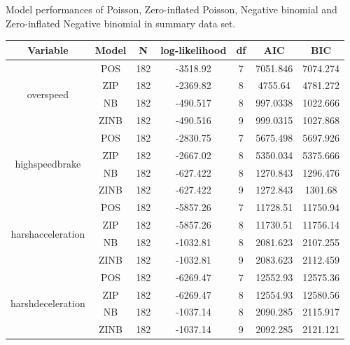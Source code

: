 \documentclass[entropy,article,submit,moreauthors,LaTeX and dvi2pdf]{Definitions/mdpi}
\begin{document}
\begin{specialtable}[htbp]
\widetable
\caption{Model performances of Poisson, Zero-inflated Poisson, Negative binomial and Zero-inflated Negative binomial in summary data set.}
\label{comparison}
\begin{tabular}{ccccccc}
\toprule
Variable                           & Model & N   & log-likelihood & df & AIC      & BIC      \\
\midrule
\multirow{4}{*}{overspeed}         & POS   & 182 & -3518.92&   7    & 7051.846 & 7074.274 \\
                                   & ZIP   & 182 & -2369.82&   8    & 4755.64  & 4781.272 \\
                                   & NB    & 182 & -490.517&    8   & 997.0338 & 1022.666 \\
                                   & ZINB  & 182 & -490.516&   9    & 999.0315 & 1027.868 \\

\multirow{4}{*}{highspeedbrake}    & POS   & 182 & -2830.75&7       & 5675.498 & 5697.926 \\
                                   & ZIP   & 182 & -2667.02&8       & 5350.034 & 5375.666 \\
                                   & NB    & 182 & -627.422&8       & 1270.843 & 1296.476 \\
                                   & ZINB  & 182 & -627.422&9       & 1272.843 & 1301.68  \\

\multirow{4}{*}{harshacceleration} & POS   & 182 & -5857.26&7       & 11728.51 & 11750.94 \\
                                   & ZIP   & 182 & -5857.26&8       & 11730.51 & 11756.14 \\
                                   & NB    & 182 & -1032.81&8       & 2081.623 & 2107.255 \\
                                   & ZINB  & 182 & -1032.81&9       & 2083.623 & 2112.459 \\

\multirow{4}{*}{harshdeceleration} & POS   & 182 & -6269.47&7       & 12552.93 & 12575.36 \\
                                   & ZIP   & 182 & -6269.47&8       & 12554.93 & 12580.56 \\
                                   & NB    & 182 & -1037.14&8       & 2090.285 & 2115.917 \\
                                   & ZINB  & 182 & -1037.14&9       & 2092.285 & 2121.121 \\
\bottomrule
\end{tabular}
\end{specialtable}
\end{document}

